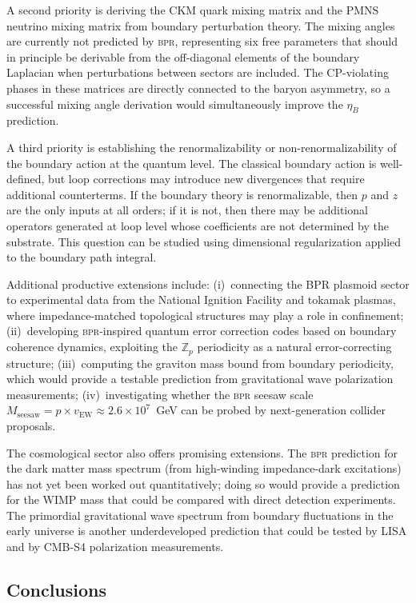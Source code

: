 \documentclass[aps,prd,twocolumn,superscriptaddress,longbibliography,nofootinbib]{revtex4-2}
\newcommand{\Zp}{\mathbb{Z}_p}
\newcommand{\vEW}{v_{\mathrm{EW}}}
\newcommand{\bpr}{\textsc{bpr}}
\begin{document}
A second priority is deriving the CKM quark mixing matrix and the
PMNS neutrino mixing matrix from boundary perturbation theory.  The
mixing angles are currently not predicted by \bpr{}, representing
six free parameters that should in principle be derivable from the
off-diagonal elements of the boundary Laplacian when perturbations
between sectors are included.  The CP-violating phases in these
matrices are directly connected to the baryon asymmetry, so a
successful mixing angle derivation would simultaneously improve the
$\eta_B$ prediction.

A third priority is establishing the renormalizability or
non-renormalizability of the boundary action at the quantum level.
The classical boundary action is well-defined, but loop corrections
may introduce new divergences that require additional counterterms.
If the boundary theory is renormalizable, then $p$ and $z$ are the
only inputs at all orders; if it is not, then there may be
additional operators generated at loop level whose coefficients are
not determined by the substrate.  This question can be studied using
dimensional regularization applied to the boundary path integral.

Additional productive extensions include: (i)~connecting the BPR
plasmoid sector to experimental data from the National Ignition
Facility and tokamak plasmas, where impedance-matched topological
structures may play a role in confinement; (ii)~developing
\bpr-inspired quantum error correction codes based on boundary
coherence dynamics, exploiting the $\Zp$ periodicity as a natural
error-correcting structure; (iii)~computing the graviton mass bound
from boundary periodicity, which would provide a testable prediction
from gravitational wave polarization measurements; (iv)~investigating
whether the \bpr{} seesaw scale $M_{\mathrm{seesaw}} = p \times \vEW
\approx 2.6 \times 10^7$~GeV can be probed by next-generation
collider proposals.

The cosmological sector also offers promising extensions.  The \bpr{}
prediction for the dark matter mass spectrum (from high-winding
impedance-dark excitations) has not yet been worked out quantitatively;
doing so would provide a prediction for the WIMP mass that could be
compared with direct detection experiments.  The primordial
gravitational wave spectrum from boundary fluctuations in the early
universe is another underdeveloped prediction that could be tested by
LISA and by CMB-S4 polarization measurements.

\subsection{Conclusions}
\end{document}
